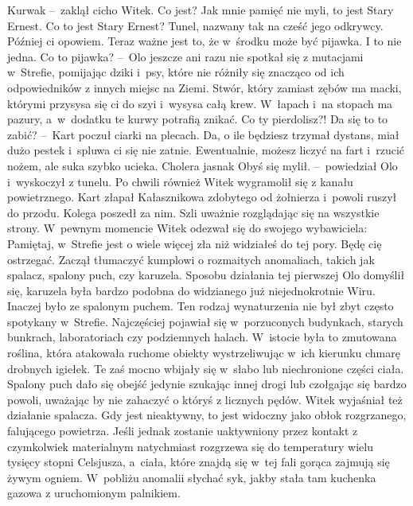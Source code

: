 \documentclass[../MAIN.tex]{subfiles}
\begin{document}
\sd
\xx Kurwa\3k --~zaklął cicho Witek.
\xx Co jest?
\xx Jak mnie pamięć nie myli, to jest Stary Ernest.
\xx Co to jest Stary Ernest?
\xx Tunel, nazwany tak na cześć jego odkrywcy. Później ci opowiem. Teraz ważne jest to, że w~środku może być pijawka. I to nie jedna.
\xx Co to pijawka? --~Olo jeszcze ani razu nie spotkał się z mutacjami w~Strefie, pomijając dziki i~psy, które nie różniły się znacząco od ich odpowiedników z innych miejsc na Ziemi.
\xx Stwór, który zamiast zębów ma macki, którymi przysysa się ci do szyi i~wysysa całą krew. W~łapach i~na stopach ma pazury, a~w~dodatku te kurwy potrafią znikać.
\xx Co ty pierdolisz?! Da się to to zabić? --~Kart poczuł ciarki na plecach.
\xx Da, o ile będziesz trzymał dystans, miał dużo pestek i~spluwa ci się nie zatnie. Ewentualnie, możesz liczyć na fart i~rzucić nożem, ale suka szybko ucieka.
\xx Cholera jasna\3k Obyś się mylił. --~powiedział Olo i~wyskoczył z tunelu.
\qd
\mm Po chwili również Witek wygramolił się z kanału powietrznego. Kart złapał Kałasznikowa zdobytego od żołnierza i~powoli ruszył do przodu. Kolega poszedł za nim. Szli uważnie rozglądając się na wszystkie strony. W~pewnym momencie Witek odezwał się do swojego wybawiciela:
\dd
\sd
\xx Pamiętaj, w~Strefie jest o wiele więcej zła niż widziałeś do tej pory. Będę cię ostrzegać.
\qd
\dd
\mm
Zaczął tłumaczyć kumplowi o rozmaitych anomaliach, takich jak spalacz, spalony puch, czy karuzela. Sposobu działania tej pierwszej Olo domyślił się, karuzela była bardzo podobna do widzianego już niejednokrotnie Wiru. Inaczej było ze spalonym puchem. Ten rodzaj wynaturzenia nie był zbyt często spotykany w~Strefie. Najczęściej pojawiał się w~porzuconych budynkach, starych bunkrach, laboratoriach czy podziemnych halach. W~istocie była to zmutowana roślina, która atakowała ruchome obiekty wystrzeliwując w~ich kierunku chmarę drobnych igiełek. Te zaś mocno wbijały się w~słabo lub niechronione części ciała. Spalony puch dało się obejść jedynie szukając innej drogi lub czołgając się bardzo powoli, uważając by nie zahaczyć o któryś z licznych pędów.
\pp
Witek wyjaśniał też działanie spalacza. Gdy jest nieaktywny, to jest widoczny jako obłok rozgrzanego, falującego powietrza. Jeśli jednak zostanie uaktywniony przez kontakt z czymkolwiek materialnym natychmiast rozgrzewa się do temperatury wielu tysięcy stopni Celsjusza, a~ciała, które znajdą się w~tej fali gorąca zajmują się żywym ogniem. W~pobliżu anomalii słychać syk, jakby stała tam kuchenka gazowa z uruchomionym palnikiem.
\end{document}
